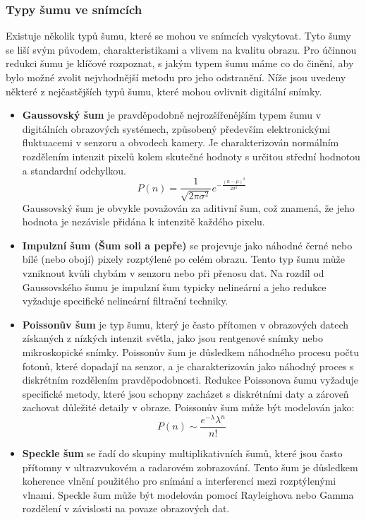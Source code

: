 \documentclass[male,czech,api_ing]{thesis}
\begin{document}
\subsubsection{Typy šumu ve snímcích}
Existuje několik typů šumu, které se mohou ve snímcích vyskytovat. Tyto šumy se liší svým původem, charakteristikami a vlivem na kvalitu obrazu. Pro účinnou redukci šumu je klíčové rozpoznat, s jakým typem šumu máme co do činění, aby bylo možné zvolit nejvhodnější metodu pro jeho odstranění. Níže jsou uvedeny některé z nejčastějších typů šumu, které mohou ovlivnit digitální snímky.

\begin{itemize}
    \item \textbf{Gaussovský šum} je pravděpodobně nejrozšířenějším typem šumu v digitálních obrazových systémech, způsobený především elektronickými fluktuacemi v senzoru a obvodech kamery. Je charakterizován normálním rozdělením intenzit pixelů kolem skutečné hodnoty s určitou střední hodnotou a standardní odchylkou. \[P(n) = \frac{1}{\sqrt{2\pi\sigma^2}} e^{-\frac{(n-\mu)^2}{2\sigma^2}}\] Gaussovský šum je obvykle považován za aditivní šum, což znamená, že jeho hodnota je nezávisle přidána k intenzitě každého pixelu. \cite{ImageDenoisingTechniques}
    \item \textbf{Impulzní šum (Šum soli a pepře)} se projevuje jako náhodné černé nebo bílé (nebo obojí) pixely rozptýlené po celém obrazu. Tento typ šumu může vzniknout kvůli chybám v senzoru nebo při přenosu dat. Na rozdíl od Gaussovského šumu je impulzní šum typicky nelineární a jeho redukce vyžaduje specifické nelineární filtrační techniky. \cite{ImageDenoisingTechniques}
    \item \textbf{Poissonův šum} je typ šumu, který je často přítomen v obrazových datech získaných z nízkých intenzit světla, jako jsou rentgenové snímky nebo mikroskopické snímky. Poissonův šum je důsledkem náhodného procesu počtu fotonů, které dopadají na senzor, a je charakterizován jako náhodný proces s diskrétním rozdělením pravděpodobnosti. Redukce Poissonova šumu vyžaduje specifické metody, které jsou schopny zacházet s diskrétními daty a zároveň zachovat důležité detaily v obraze. \cite{ImageDenoisingTechniques} Poissonův šum může být modelován jako: \[ P(n) \sim \frac{e^{-\lambda} \lambda^n}{n!}\] 
    \item \textbf{Speckle šum} se řadí do skupiny multiplikativních šumů, které jsou často přítomny v ultrazvukovém a radarovém zobrazování. Tento šum je důsledkem koherence vlnění použitého pro snímání a interferencí mezi rozptýlenými vlnami. Speckle šum může být modelován pomocí Rayleighova nebo Gamma rozdělení v závislosti na povaze obrazových dat. \cite{ImageDenoisingTechniques}
\end{itemize}
\end{document}
